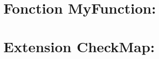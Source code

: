\documentclass[12pt,a4paper]{article}
\begin{document}

\newpage
\section{Fonction MyFunction:}

\newpage
\section{Extension CheckMap:}

\newpage
\end{document}
